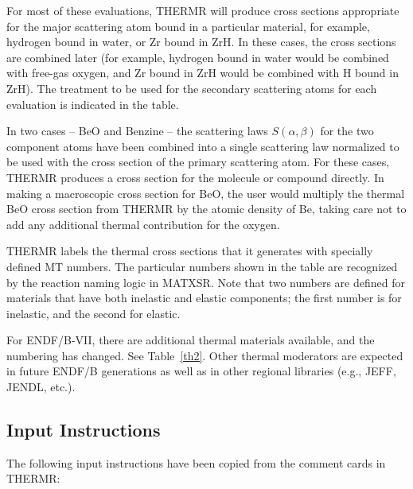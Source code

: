 For most of these evaluations, THERMR will produce cross sections
appropriate for the major scattering atom bound in a particular
material, for example, hydrogen bound in water, or Zr bound in ZrH.
In these cases, the cross sections are combined later (for example,
hydrogen bound in water would be combined with free-gas oxygen, and
Zr bound in ZrH would be combined with H bound in ZrH).  The treatment
to be used for the secondary scattering atoms for each evaluation is
indicated in the table.

In two cases -- BeO and Benzine -- the scattering laws $S(\alpha,\beta)$
for the two component atoms have been combined into a single
scattering law normalized to be used with the cross section of
the primary scattering atom.  For these cases, THERMR produces
a cross section for the molecule or compound directly.  In making
a macroscopic cross section for BeO, the user would multiply the
thermal BeO cross section from THERMR by the atomic density of Be,
taking care not to add any additional thermal contribution for the
oxygen.

THERMR labels the thermal cross sections that it generates with
specially defined MT numbers.  The particular numbers shown in the
table are recognized by the reaction naming logic in MATXSR.  Note
that two numbers are defined for materials that have both inelastic
and elastic components; the first number is for inelastic, and the
second for elastic.

For ENDF/B-VII, there are additional thermal materials available,
and the numbering has changed.  See Table~\ref{th2}.  Other thermal
moderators are expected in future ENDF/B generations as well as in
other regional libraries (e.g., JEFF, JENDL, etc.).

\subsection{Input Instructions}
\label{ssTHERMR_inp}

The following input instructions have been copied from the comment
cards in THERMR:

